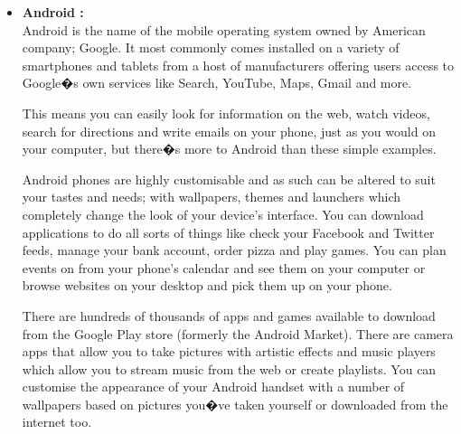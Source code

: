 \documentclass[a4paper,12pt]{article}
\begin{document}
\begin{itemize}
\item \textbf{Android :}\\
Android is the name of the mobile operating system owned by American company; Google. It most commonly comes installed on a variety of smartphones and tablets from a host of manufacturers offering users access to Google�s own services like Search, YouTube, Maps, Gmail and more.

This means you can easily look for information on the web, watch videos, search for directions and write emails on your phone, just as you would on your computer, but there�s more to Android than these simple examples.

Android phones are highly customisable and as such can be altered to suit your tastes and needs; with wallpapers, themes and launchers which completely change the look of your device's interface. You can download applications to do all sorts of things like check your Facebook and Twitter feeds, manage your bank account, order pizza and play games. You can plan events on from your phone's calendar and see them on your computer or browse websites on your desktop and pick them up on your phone.

There are hundreds of thousands of apps and games available to download from the Google Play store (formerly the Android Market). There are camera apps that allow you to take pictures with artistic effects and music players which allow you to stream music from the web or create playlists. You can customise the appearance of your Android handset with a number of wallpapers based on pictures you�ve taken yourself or downloaded from the internet too.
\end{itemize}
\end{document}
